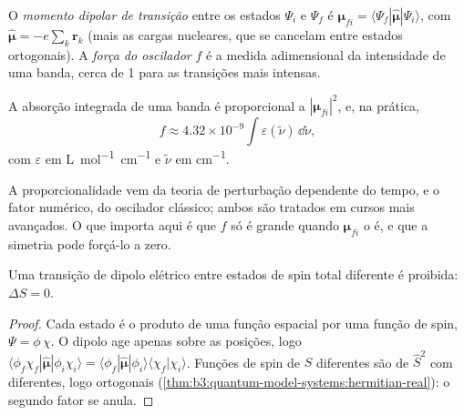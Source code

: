 \begin{definition}\label{def:b3:electronic-spectroscopy:transition-dipole}
O \emph{momento dipolar de transição} entre os
estados $\Psi_i$ e $\Psi_f$ é $\boldsymbol\mu_{fi} = \langle\Psi_f|\hat{\boldsymbol\mu}|\Psi_i
\rangle$, com $\hat{\boldsymbol\mu} = -e\sum_k\mathbf r_k$ (mais as cargas
nucleares, que se cancelam entre estados ortogonais). A \emph{força do
oscilador} $f$ é a medida adimensional da
intensidade de uma banda, cerca de 1 para as transições mais intensas.
\end{definition}

\begin{proposition}\label{prop:b3:electronic-spectroscopy:intensity}
A absorção integrada de uma banda é proporcional a $|\boldsymbol\mu_{fi}|^2$,
e, na prática,
\[
f \approx 4.32\times10^{-9}\int\varepsilon(\tilde\nu)\,\dd\tilde\nu,
\]
com $\varepsilon$ em \unit{L.mol^{-1}.cm^{-1}} e $\tilde\nu$ em \unit{cm^{-1}}.
\end{proposition}
\admitted

A proporcionalidade vem da teoria de perturbação dependente do tempo, e o
fator numérico, do oscilador clássico; ambos são tratados em cursos mais
avançados. O que importa aqui é que $f$ só é grande quando
$\boldsymbol\mu_{fi}$ o é, e que a simetria pode forçá-lo a zero.

\begin{theorem}\label{thm:b3:electronic-spectroscopy:spin-rule}
Uma transição de dipolo elétrico entre estados de spin total diferente é
proibida: $\Delta S = 0$.
\end{theorem}

\begin{proof}
Cada estado é o produto de uma função espacial por uma função de spin, $\Psi = \phi\,\chi$.
O  dipolo age apenas sobre as posições, logo $\langle\phi_f\chi_f|\hat{\boldsymbol\mu}|
\phi_i\chi_i\rangle = \langle\phi_f|\hat{\boldsymbol\mu}|\phi_i\rangle\langle\chi_f|\chi_i\rangle$.
Funções de spin de $S$ diferentes são  de $\hat S^2$ com 
diferentes, logo ortogonais (\cref{thm:b3:quantum-model-systems:hermitian-real}):
o segundo fator se anula.
\end{proof}

